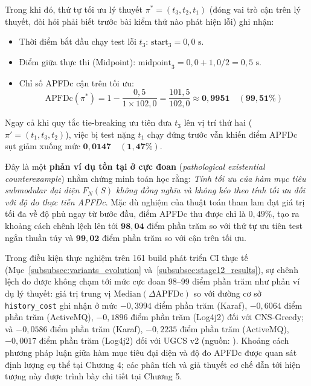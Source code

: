Trong khi đó, thứ tự tối ưu lý thuyết $\pi^* = (t_3, t_2, t_1)$ (đóng vai trò cận trên lý thuyết, đòi hỏi phải biết trước bài kiểm thử nào phát hiện lỗi) ghi nhận:
\begin{itemize}
    \item Thời điểm bắt đầu chạy test lỗi $t_3$: $\text{start}_3 = 0{,}0\text{ s}$.
    \item Điểm giữa thực thi (Midpoint): $\text{midpoint}_3 = 0{,}0 + 1{,}0 / 2 = 0{,}5\text{ s}$.
    \item Chỉ số APFDc cận trên tối ưu:
    \begin{equation}
    \text{APFDc}(\pi^*) = 1 - \frac{0{,}5}{1 \times 102{,}0} = \frac{101{,}5}{102{,}0} \approx \mathbf{0{,}9951 \quad (99{,}51\%)}
    \end{equation}
\end{itemize}

Ngay cả khi quy tắc tie-breaking ưu tiên đưa $t_3$ lên vị trí thứ hai ($\pi' = (t_1, t_3, t_2)$), việc bị test nặng $t_1$ chạy đứng trước vẫn khiến điểm APFDc sụt giảm xuống mức $\mathbf{0{,}0147 \quad (1{,}47\%)}$.

\begin{nx}
Đây là một \textbf{phản ví dụ tồn tại ở cực đoan} (\textit{pathological existential counterexample}) nhằm chứng minh toán học rằng: \textit{Tính tối ưu của hàm mục tiêu submodular đại diện $F_N(S)$ không đồng nghĩa và không kéo theo tính tối ưu đối với độ đo thực tiễn APFDc}. Mặc dù nghiệm của thuật toán tham lam đạt giá trị tối đa về độ phủ ngay từ bước đầu, điểm APFDc thu được chỉ là $0{,}49\%$, tạo ra khoảng cách chênh lệch lên tới $\mathbf{98{,}04}$ điểm phần trăm so với thứ tự ưu tiên test ngắn thuần túy và $\mathbf{99{,}02}$ điểm phần trăm so với cận trên tối ưu.

Trong điều kiện thực nghiệm trên 161 build phát triển CI thực tế (Mục~\ref{subsubsec:variants_evolution} và~\ref{subsubsec:stage12_results}), sự chênh lệch đo được không chạm tới mức cực đoan 98--99 điểm phần trăm như phản ví dụ lý thuyết: giá trị trung vị $\text{Median}(\Delta\text{APFDc})$ so với đường cơ sở \texttt{history\_cost} ghi nhận ở mức $-0{,}3994$ điểm phần trăm (Karaf), $-0{,}6064$ điểm phần trăm (ActiveMQ), $-0{,}1896$ điểm phần trăm (Log4j2) đối với CNS-Greedy; và $-0{,}0586$ điểm phần trăm (Karaf), $-0{,}2235$ điểm phần trăm (ActiveMQ), $-0{,}0017$ điểm phần trăm (Log4j2) đối với UGCS v2 (nguồn: ). Khoảng cách phương pháp luận giữa hàm mục tiêu đại diện và độ đo APFDc được quan sát định lượng cụ thể tại Chương 4; các phân tích và giả thuyết cơ chế dẫn tới hiện tượng này được trình bày chi tiết tại Chương 5.
\end{nx}

